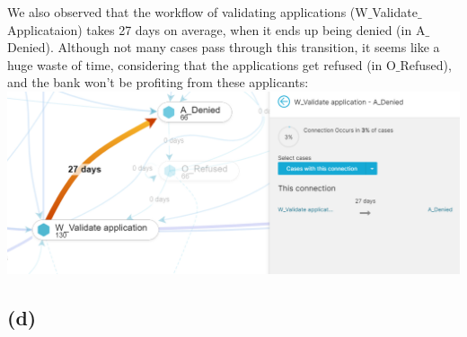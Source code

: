 \documentclass[../../main.tex]{subfiles}
\begin{document}
We also observed that the workflow of validating applications (W$\_$Validate$\_$Applicataion) takes 27 days on average, when it ends up being denied (in A$\_$Denied). Although not many cases pass through this transition, it seems like a huge waste of time, considering that the applications get refused (in O$\_$Refused), and the bank won't be profiting from these applicants:\\
\includegraphics[width=\textwidth]{img/QUESTION_5c_W_Validate.png}



\subsection*{(d)}
\end{document}
